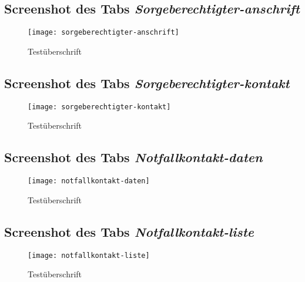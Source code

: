 \begin{landscape}
\subsection{Screenshot des Tabs \textit{Sorgeberechtigter-anschrift}}
\label{section-sorgeberechtigter-anschrift}
\begin{figure}[H]
    \centering
    \caption{Testüberschrift}
    \begin{adjustbox}{width=0.85\linewidth, center}
        \texttt{[image: sorgeberechtigter-anschrift]}
    \end{adjustbox}
\end{figure}

\subsection{Screenshot des Tabs \textit{Sorgeberechtigter-kontakt}}
\label{section-sorgeberechtigter-kontakt}
\begin{figure}[H]
    \centering
    \caption{Testüberschrift}
    \begin{adjustbox}{width=0.6\linewidth, center}
        \texttt{[image: sorgeberechtigter-kontakt]}
    \end{adjustbox}
\end{figure}

\subsection{Screenshot des Tabs \textit{Notfallkontakt-daten}}
\label{section-notfallkontakt-daten}
\begin{figure}[H]
    \centering
    \caption{Testüberschrift}
    \begin{adjustbox}{width=0.6\linewidth, center}
        \texttt{[image: notfallkontakt-daten]}
    \end{adjustbox}
\end{figure}

\subsection{Screenshot des Tabs \textit{Notfallkontakt-liste}}
\label{section-notfallkontakt-liste}
\begin{figure}[H]
    \centering
    \caption{Testüberschrift}
    \begin{adjustbox}{width=\linewidth, center}
        \texttt{[image: notfallkontakt-liste]}
    \end{adjustbox}
\end{figure}


\end{landscape}
